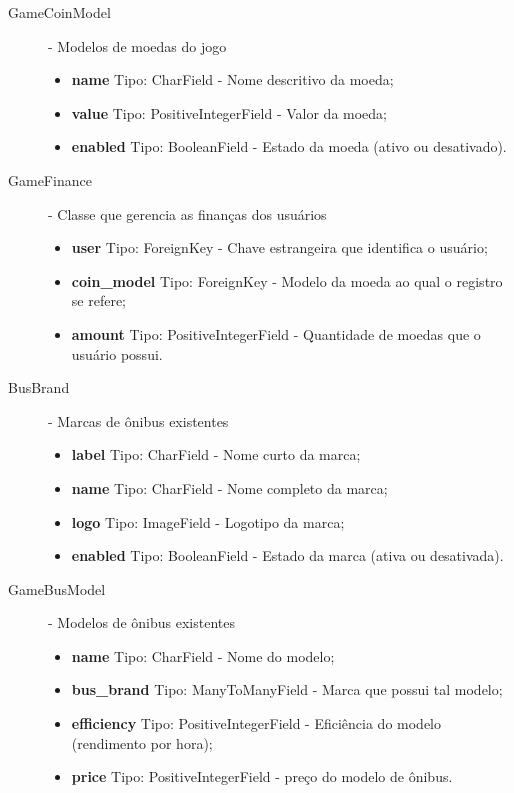 \begin{description}
    \item[GameCoinModel] - Modelos de moedas do jogo
        \begin{itemize}
            \item \textbf{name} Tipo: CharField - Nome descritivo da moeda;
            \item \textbf{value} Tipo: PositiveIntegerField - Valor da moeda;
            \item \textbf{enabled} Tipo: BooleanField - Estado da moeda (ativo ou desativado).
        \end{itemize}
    \item[GameFinance] - Classe que gerencia as finanças dos usuários
        \begin{itemize}
            \item \textbf{user} Tipo: ForeignKey - Chave estrangeira que identifica o usuário;
            \item \textbf{coin\_model} Tipo: ForeignKey - Modelo da moeda ao qual o registro se refere;
            \item \textbf{amount} Tipo: PositiveIntegerField - Quantidade de moedas que o usuário possui.
        \end{itemize}
    \item[BusBrand] - Marcas de ônibus existentes
        \begin{itemize}
            \item \textbf{label} Tipo: CharField - Nome curto da marca;
            \item \textbf{name} Tipo: CharField - Nome completo da marca;
            \item \textbf{logo} Tipo: ImageField - Logotipo da marca;
            \item \textbf{enabled} Tipo: BooleanField - Estado da marca (ativa ou desativada).
        \end{itemize}
    \item[GameBusModel] - Modelos de ônibus existentes
        \begin{itemize}
            \item \textbf{name} Tipo: CharField - Nome do modelo;
            \item \textbf{bus\_brand} Tipo: ManyToManyField - Marca que possui tal modelo;
            \item \textbf{efficiency} Tipo: PositiveIntegerField - Eficiência do modelo (rendimento por hora);
            \item \textbf{price} Tipo: PositiveIntegerField - preço do modelo de ônibus.

\end{itemize}
\end{description}

